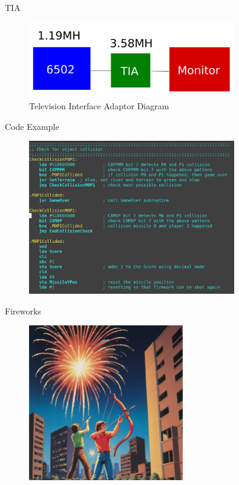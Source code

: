 \documentclass{beamer}
\begin{document}
\begin{frame}{TIA}
    \begin{figure}
        \centering
        \includegraphics[width=0.8\textwidth]{TIA_diagram.png} %

        \caption{Television Interface Adaptor Diagram}
    \end{figure}
\end{frame}


\begin{frame}{Code Example}
    \begin{figure}
        \centering
        \includegraphics[width=0.8\textwidth]{assembly.png} %

    \end{figure}
\end{frame}

\begin{frame}{Fireworks}
    \begin{figure}
        \centering
        \includegraphics[width=0.6\textwidth]{cover.jpg} %

    \end{figure}
\end{frame}
\end{document}

